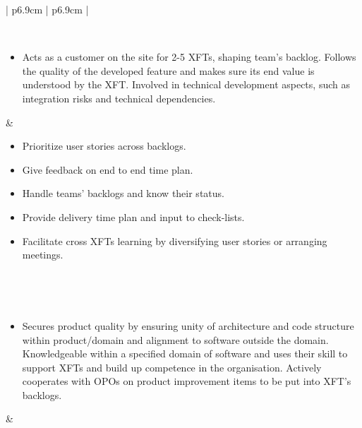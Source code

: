 \begin{table}[h]
   \begin{tabularx}{\textwidth}{ | p{6.9cm} | p{6.9cm} | }
   
   \hline
   
   \\ \hline
   
   \begin{itemize}[label={}, leftmargin=*, topsep=0pt, itemsep=0pt, partopsep=0pt]
     \item Acts as a customer on the site for 2-5 \acp{XFT}, shaping team's backlog. Follows the quality of the developed feature and makes sure its end value is understood by the \ac{XFT}. Involved in technical development aspects, such as integration risks and technical dependencies.
   \end{itemize} & 
   
   \begin{itemize}[label={}, leftmargin=*, topsep=0pt, itemsep=0pt, partopsep=0pt]
     \item Prioritize user stories across backlogs.
     \item Give feedback on end to end time plan.
     \item Handle teams' backlogs and know their status.
     \item Provide delivery time plan and input to check-lists.
     \item Facilitate cross \acp{XFT} learning by diversifying user stories or arranging meetings.
   \end{itemize} 
   
   \\ \hline
      
   
   \\ \hline
   
   \begin{itemize}[label={}, leftmargin=*, topsep=0pt, itemsep=0pt, partopsep=0pt]
     \item Secures product quality by ensuring unity of architecture and code structure within product/domain and alignment to software outside the domain. Knowledgeable within a specified domain of software and uses their skill to support \acp{XFT} and build up competence in the organisation. Actively cooperates with \acp{OPO} on product improvement items to be put into \ac{XFT}'s backlogs.
   \end{itemize} & 
   

\end{tabularx}
\end{table}
